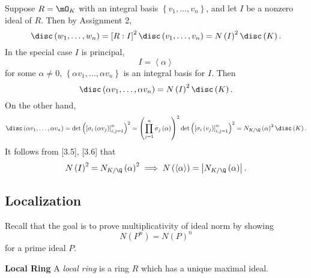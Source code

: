 \documentclass[pmath441]{subfiles}
\begin{document}
    \np Suppose $R = \mO_K$ with an integral basis $\left\lbrace v_1,\ldots,v_n \right\rbrace$, and let $I$ be a nonzero ideal of $R$. Then by Assignment 2,
    \begin{equation*}
        \disc\left( w_1,\ldots,w_n \right) = \left[ R:I \right]^{2} \disc\left( v_1,\ldots,v_n \right) = N\left( I \right)^{2}\disc\left( K \right).
    \end{equation*}
    In the special case $I$ is principal,
    \begin{equation*}
        I = \left< \alpha \right> 
    \end{equation*}
    for some $\alpha\neq 0$, $\left\lbrace \alpha v_1,\ldots,\alpha v_n \right\rbrace$ is an integral basis for $I$. Then
    \begin{equation}
        \disc\left( \alpha v_1,\ldots,\alpha v_n \right) = N\left( I \right)^{2}\disc\left( K \right).
    \end{equation}
    On the other hand,
    \begin{equation}
        \disc\left( \alpha v_1,\ldots,\alpha v_n \right) = \det \left(\left[ \sigma_i\left( \alpha v_j \right) \right]^n_{i,j=1}\right)^{2} = \left( \prod^{n}_{j=1}\sigma_j\left( \alpha \right) \right)^{2} \det \left( \left[ \sigma_i\left( v_j \right) \right]^n_{i,j=1} \right)^{2} = N_{K /\Q}\left( \alpha \right)^{2} \disc\left( K \right).
    \end{equation}
    It follows from [3.5], [3.6] that
    \begin{equation*}
        N\left( I \right)^{2} = N_{K /\Q}\left( \alpha \right)^{2} \implies N\left( \left< \alpha \right>  \right) = \left| N_{K /\Q}\left( \alpha \right) \right|.
    \end{equation*}
    
    \subsection{Localization}

    Recall that the goal is to prove multiplicativity of ideal norm by showing
    \begin{equation*}
        N\left( P^n \right) = N\left( P \right)^n
    \end{equation*}
    for a prime ideal $P$.
    
    \begin{definition}{\textbf{Local Ring}}
        A \emph{local ring} is a ring $R$ which has a unique maximal ideal.
    \end{definition}
\end{document}

